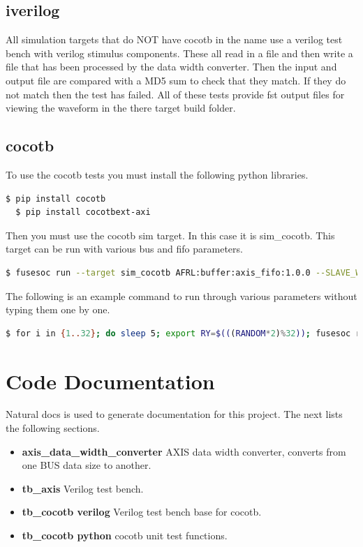 \subsection{iverilog}
\par
All simulation targets that do NOT have cocotb in the name use a verilog test bench with verilog stimulus components. These all read in a file
and then write a file that has been processed by the data width converter. Then the input and output file are compared with a MD5 sum to check that they
match. If they do not match then the test has failed. All of these tests provide fst output files for viewing the waveform in the there
target build folder.

\subsection{cocotb}
\par
To use the cocotb tests you must install the following python libraries.
\begin{lstlisting}[language=bash]
  $ pip install cocotb
  $ pip install cocotbext-axi
\end{lstlisting}

Then you must use the cocotb sim target. In this case it is sim\_cocotb. This target can be run with various bus and fifo parameters.
\begin{lstlisting}[language=bash]
  $ fusesoc run --target sim_cocotb AFRL:buffer:axis_fifo:1.0.0 --SLAVE_WIDTH=8 --MASTER_WIDTH=32
\end{lstlisting}

The following is an example command to run through various parameters without typing them one by one.
\begin{lstlisting}[language=bash]
  $ for i in {1..32}; do sleep 5; export RY=$(((RANDOM*2)%32)); fusesoc run --target sim_cocotb AFRL:buffer:axis_fifo:1.0.0 --SLAVE_WIDTH=$i --MASTER_WIDTH=$RY; echo "SLAVE WIDTH:" $i "MASTER WIDTH:" $RY; done
\end{lstlisting}
\newpage

\section{Code Documentation} \label{Code Documentation}

\par
Natural docs is used to generate documentation for this project. The next lists the following sections.

\begin{itemize}
\item \textbf{axis\_data\_width\_converter} AXIS data width converter, converts from one BUS data size to another.\\
\item \textbf{tb\_axis} Verilog test bench.\\
\item \textbf{tb\_cocotb verilog} Verilog test bench base for cocotb.\\
\item \textbf{tb\_cocotb python} cocotb unit test functions.\\
\end{itemize}

